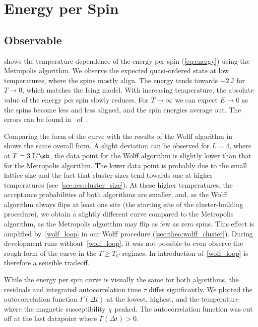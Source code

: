 \section{Energy per Spin}\label{sec:res:energy}
	\subsection{Observable}\label{sec:res:energy:observable}
		 shows the temperature dependence of the energy per spin (\cref{eq:energy}) using the Metropolis algorithm. We observe the expected quasi-ordered state at low temperatures, where the spins mostly align. The energy tends towards $\SI{-2}{\joule}$ for $T\rightarrow 0$, which matches the Ising model. With increasing temperature, the absolute value of the energy per spin slowly reduces. For $T \rightarrow \infty$ we can expect $E \rightarrow 0$ as the spins become less and less aligned, and the spin energies average out. The errors can be found in~ of~.
		
		Comparing the form of the curve with the results of the Wolff algorithm in~ shows the same overall form. A slight deviation can be observed for $L = 4$, where at $T = \SI{3}{\joule\per\kb}$, the data point for the Wolff algorithm is slightly lower than that for the Metropolis algorithm. The lower data point is probably due to the small lattice size and the fact that cluster sizes tend towards one at higher temperatures (see~\cref{sec:res:cluster_size}). At these higher temperatures, the acceptance probabilities of both algorithms are smaller, and, as the Wolff algorithm always flips at least one site (the starting site of the cluster-building procedure), we obtain a slightly different curve compared to the Metropolis algorithm, as the Metropolis algorithm may flip as few as zero spins. This effect is amplified by~\cref{wolf_loop} in our Wolff procedure (\cref{sec:theo:wolff_cluster}). During development runs without~\cref{wolf_loop}, it was not possible to even observe the rough form of the curve in the $T \geq T_C$ regimes. In introduction of~\cref{wolf_loop} is therefore a sensible tradeoff.
		
		While the energy per spin curve is visually the same for both algorithms, the residuals and integrated autocorrelation time $\tau$ differ significantly. We plotted the autocorrelation function $\Gamma(\Delta t)$ at the lowest, highest, and the temperature where  the magnetic susceptibility $\chi$ peaked. The autocorrelation function was cut off at the last datapoint where $\Gamma(\Delta t) > \num{0}$.
		
